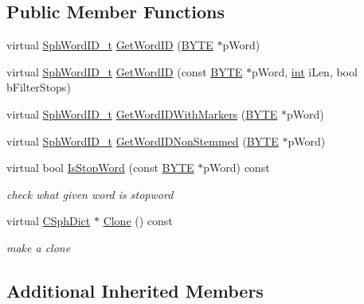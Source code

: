 \subsection*{Public Member Functions}
\begin{DoxyCompactItemize}
\item 
virtual \hyperlink{sphinx_8h_a80a94d5984fdf9214a98f3e5e65df963}{Sph\-Word\-I\-D\-\_\-t} \hyperlink{structCSphDictCRC_a97c1d147deae64ab7727339dcc048bc9}{Get\-Word\-I\-D} (\hyperlink{sphinxstd_8h_a4ae1dab0fb4b072a66584546209e7d58}{B\-Y\-T\-E} $\ast$p\-Word)
\item 
virtual \hyperlink{sphinx_8h_a80a94d5984fdf9214a98f3e5e65df963}{Sph\-Word\-I\-D\-\_\-t} \hyperlink{structCSphDictCRC_a093268cac147fea2ca0b175271b816fb}{Get\-Word\-I\-D} (const \hyperlink{sphinxstd_8h_a4ae1dab0fb4b072a66584546209e7d58}{B\-Y\-T\-E} $\ast$p\-Word, \hyperlink{sphinxexpr_8cpp_a4a26e8f9cb8b736e0c4cbf4d16de985e}{int} i\-Len, bool b\-Filter\-Stops)
\item 
virtual \hyperlink{sphinx_8h_a80a94d5984fdf9214a98f3e5e65df963}{Sph\-Word\-I\-D\-\_\-t} \hyperlink{structCSphDictCRC_abbbf7feb7b6df84de9eba18135f421e2}{Get\-Word\-I\-D\-With\-Markers} (\hyperlink{sphinxstd_8h_a4ae1dab0fb4b072a66584546209e7d58}{B\-Y\-T\-E} $\ast$p\-Word)
\item 
virtual \hyperlink{sphinx_8h_a80a94d5984fdf9214a98f3e5e65df963}{Sph\-Word\-I\-D\-\_\-t} \hyperlink{structCSphDictCRC_ac7ab018b0eb335c023853044a56a3caa}{Get\-Word\-I\-D\-Non\-Stemmed} (\hyperlink{sphinxstd_8h_a4ae1dab0fb4b072a66584546209e7d58}{B\-Y\-T\-E} $\ast$p\-Word)
\item 
virtual bool \hyperlink{structCSphDictCRC_a47d9398bc437b551b0e79e557866fe59}{Is\-Stop\-Word} (const \hyperlink{sphinxstd_8h_a4ae1dab0fb4b072a66584546209e7d58}{B\-Y\-T\-E} $\ast$p\-Word) const 
\begin{DoxyCompactList}\small\item\em check what given word is stopword \end{DoxyCompactList}\item 
virtual \hyperlink{classCSphDict}{C\-Sph\-Dict} $\ast$ \hyperlink{structCSphDictCRC_add334a7b16667fe906a821e651344f38}{Clone} () const 
\begin{DoxyCompactList}\small\item\em make a clone \end{DoxyCompactList}\end{DoxyCompactItemize}
\subsection*{Additional Inherited Members}


